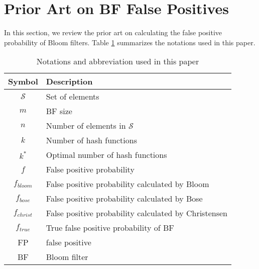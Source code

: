 \presec \section{Prior Art on BF False Positives} \postsec \label{sec:priorarts}
%
In this section, we review the prior art on calculating the false positive probability of Bloom filters.
%
Table \ref{table:symbols} summarizes the notations used in this paper.

\begin{table} [htbp]
\vspace{0in}
\caption{Notations and abbreviation used in this paper}
\centering
\label{table:symbols}
\begin{tabular}{| c | l |}
\hline Symbol & Description \\
\hline $\mathcal{S}$ & Set of elements\\
\hline $m$  & BF size\\
\hline $n$  & Number of elements in $\mathcal{S}$\\
\hline $k$  & Number of hash functions \\
\hline $k^*$  & Optimal number of hash functions \\
\hline $f$  & False positive probability \\
\hline $f_{bloom}$ & False positive probability calculated by Bloom \\
\hline $f_{bose}$ & False positive probability calculated by Bose \\
\hline $f_{christ}$ & False positive probability calculated by Christensen \\
\hline $f_{true}$        & True false positive probability of BF\\
\hline FP        & false positive\\
\hline BF        & Bloom filter\\
\hline
\end{tabular}
\end{table}

